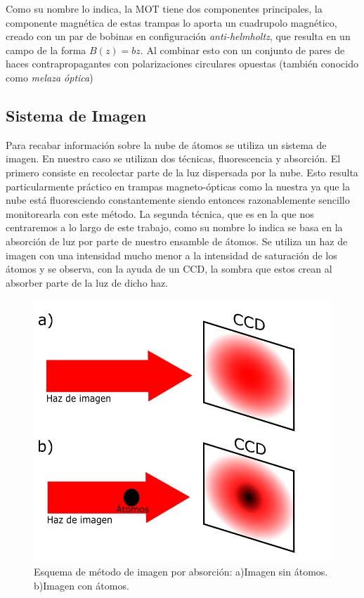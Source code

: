 \documentclass[12pt,twoside]{article}
\begin{document}
Como su nombre lo indica, la MOT tiene dos componentes principales, la componente  magnética de estas trampas lo aporta un cuadrupolo magnético, creado con un par de bobinas en configuración \textit{anti-helmholtz}, que resulta en un campo de la forma $B(z) = bz$. Al combinar esto con un conjunto de pares de haces contrapropagantes con polarizaciones circulares opuestas (también conocido como \textit{melaza óptica})   


\subsection{Sistema de Imagen}\label{absorcion}

Para recabar información sobre la nube de átomos se utiliza un sistema de imagen. En nuestro caso se utilizan dos técnicas, fluorescencia y absorción. 
El primero consiste en recolectar parte de la luz dispersada por la nube. Esto resulta particularmente práctico en trampas magneto-ópticas como la nuestra ya que la nube está fluoresciendo constantemente siendo entonces razonablemente sencillo monitorearla con este método. La segunda técnica, que es en la que nos centraremos a lo largo de este trabajo, como su nombre lo indica se basa en la absorción de luz por parte de nuestro ensamble de átomos. Se utiliza un haz de imagen con una intensidad mucho menor a la intensidad de saturación de los átomos y se observa, con la ayuda de un CCD, la sombra que estos crean al absorber parte de la luz de dicho haz.\\
\begin{figure}[h] 
    \begin{center}
        \includegraphics[width=0.6\linewidth]{esqabs.png}
    \end{center}
    \caption{Esquema de método de imagen por absorción: a)Imagen sin átomos. b)Imagen con átomos. }
    \label{esqimgabs}
\end{figure} \\
\end{document}
